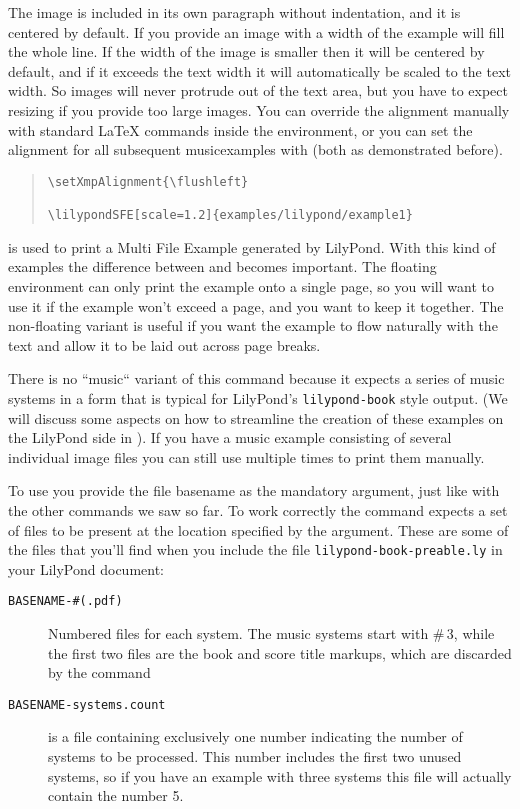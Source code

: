 \documentclass[../openLilyLib]{subfiles}
\begin{document}
The image is included in its own paragraph without indentation, and it is centered by default.
If you provide an image with a width of  the example will fill the whole line.
If the width of the image is smaller then it will be centered by default, and if it exceeds the text width it will automatically be scaled to the text width.
So images will never protrude out of the text area, but you have to expect resizing if you provide too large images.
You can override the alignment manually with standard LaTeX commands inside the environment, or you can set the alignment for all subsequent musicexamples with  (both as demonstrated before).

\begin{quote}
\begin{verbatim}
\setXmpAlignment{\flushleft}

\lilypondSFE[scale=1.2]{examples/lilypond/example1}
\end{verbatim}
\end{quote}

 is used to print a Multi File Example generated by LilyPond.
With this kind of examples the difference between  and  becomes important.
The floating environment can only print the example onto a single page, so you will want to use it if the example won't exceed a page, and you want to keep it together.
The non-floating variant is useful if you want the example to flow naturally with the text and allow it to be laid out across page breaks.

There is no “music“ variant of this command because it expects a series of music systems in a form that is typical for LilyPond's \texttt{lilypond-book} style output.
(We will discuss some aspects on how to streamline the creation of these examples on the LilyPond side in ).
If you have a music example consisting of several individual image files you can still use  multiple times to print them manually.

To use  you provide the file basename as the mandatory argument, just like with the other commands we saw so far.
To work correctly the command expects a set of files to be present at the location specified by the argument.
These are some of the files that you'll find when you include the file \texttt{lilypond-book-preable.ly} in your LilyPond document:
\begin{description}
\item[\texttt{BASENAME-\#(.pdf)}] Numbered files for each system.
The music systems start with \#\,3, while the first two files are the book and score title markups, which are discarded by the command
\item[\texttt{BASENAME-systems.count}] is a file containing exclusively one number indicating the number of systems to be processed.
This number includes the first two unused systems, so if you have an example with three systems this file will actually contain the number 5.
\end{description}
\end{document}
